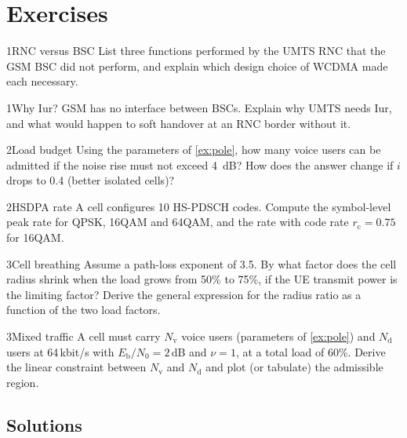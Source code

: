 \documentclass[11pt,a4paper]{article}
\begin{document}
\section{Exercises}

\begin{exercisebox}{1}{RNC versus BSC}\label{exr:rnc}
List three functions performed by the UMTS RNC that the GSM BSC did not perform, and explain
which design choice of WCDMA made each necessary.
\end{exercisebox}

\begin{exercisebox}{1}{Why Iur?}\label{exr:iur}
GSM has no interface between BSCs. Explain why UMTS needs Iur, and what would happen to soft
handover at an RNC border without it.
\end{exercisebox}

\begin{exercisebox}{2}{Load budget}\label{exr:load}
Using the parameters of \cref{ex:pole}, how many voice users can be admitted if the noise rise
must not exceed \qty{4}{\dB}? How does the answer change if $i$ drops to 0.4 (better isolated cells)?
\end{exercisebox}

\begin{exercisebox}{2}{HSDPA rate}\label{exr:hsdpa}
A cell configures 10 HS-PDSCH codes. Compute the symbol-level peak rate for QPSK, 16QAM and
64QAM, and the rate with code rate $r_\mathrm{c}=0.75$ for 16QAM.
\end{exercisebox}

\begin{exercisebox}{3}{Cell breathing}\label{exr:breath}
Assume a path-loss exponent of 3.5. By what factor does the cell radius shrink when the load
grows from 50\% to 75\%, if the UE transmit power is the limiting factor? Derive the general
expression for the radius ratio as a function of the two load factors.
\end{exercisebox}

\begin{exercisebox}{3}{Mixed traffic}\label{exr:mixed}
A cell must carry $N_\mathrm{v}$ voice users (parameters of \cref{ex:pole}) and $N_\mathrm{d}$
users at 64\,kbit/s with $E_\mathrm{b}/N_0 = 2$\,dB and $\nu=1$, at a total load of 60\%.
Derive the linear constraint between $N_\mathrm{v}$ and $N_\mathrm{d}$ and plot (or tabulate) the
admissible region.
\end{exercisebox}

\subsection*{Solutions}
\end{document}
